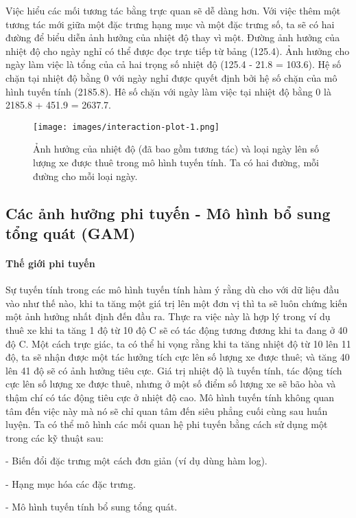 Việc hiểu các mối tương tác bằng trực quan sẽ dễ dàng hơn. Với việc thêm một tương tác mới giữa một đặc trưng hạng mục và một đặc trưng số, ta sẽ có hai đường để biểu diễn ảnh hưởng của nhiệt độ thay vì một. Đường ảnh hưởng của nhiệt độ cho ngày nghỉ có thể được đọc trực tiếp từ bảng (125.4). Ảnh hưởng cho ngày làm việc là tổng của cả hai trọng số nhiệt độ (125.4 - 21.8 = 103.6). Hệ số chặn tại nhiệt độ bằng 0 với ngày nghỉ được quyết định bởi hệ số chặn của mô hình tuyến tính (2185.8). Hê số chặn với ngày làm việc tại nhiệt độ bằng 0 là 2185.8 + 451.9 = 2637.7.

\begin{figure*}[h!]
	\centering
	\texttt{[image: images/interaction-plot-1.png]}
	\label{fig:4_3_12}
	\caption{Ảnh hưởng của nhiệt độ (đã bao gồm tương tác) và loại ngày lên số lượng xe được thuê trong mô hình tuyến tính. Ta có hai đường, mỗi đường cho mỗi loại ngày.}
\end{figure*}

\subsection{Các ảnh hưởng phi tuyến - Mô hình bổ sung tổng quát (GAM)}
\label{GAMs}

\paragraph{Thế giới phi tuyến} Sự tuyến tính trong các mô hình tuyến tính hàm ý rằng dù cho với dữ liệu đầu vào như thế nào, khi ta tăng một giá trị lên một đơn vị thì ta sẽ luôn chứng kiến một ảnh hưởng nhất định đến đầu ra. Thực ra việc này là hợp lý trong ví dụ thuê xe khi ta tăng 1 độ từ 10 độ C sẽ có tác động tương đương khi ta đang ở 40 độ C. Một cách trực giác, ta có thể hi vọng rằng khi ta tăng nhiệt độ từ 10 lên 11 độ, ta sẽ nhận được một tác hưởng tích cực lên số lượng xe được thuê; và tăng 40 lên 41 độ sẽ có ảnh hưởng tiêu cực. Giá trị nhiệt độ là tuyến tính, tác động tích cực lên số lượng xe được thuê, nhưng ở một số điểm số lượng xe sẽ bão hòa và thậm chí có tác động tiêu cực ở nhiệt độ cao. Mô hình tuyến tính không quan tâm đến việc này mà nó sẽ chỉ quan tâm đến siêu phẳng cuối cùng sau huấn luyện.
Ta có thể mô hình các mối quan hệ phi tuyến bằng cách sử dụng một trong các kỹ thuật sau:

- Biến đổi đặc trưng một cách đơn giản (ví dụ dùng hàm log).

- Hạng mục hóa các đặc trưng.

- Mô hình tuyến tính bổ sung tổng quát.

